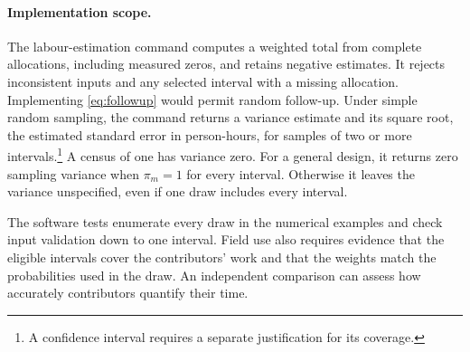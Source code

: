 \paragraph{Implementation scope.}
The labour-estimation command computes a weighted total from complete allocations, including measured zeros, and retains negative estimates. It rejects inconsistent inputs and any selected interval with a missing allocation. Implementing \eqref{eq:followup} would permit random follow-up. Under simple random sampling, the command returns a variance estimate and its square root, the estimated standard error in person-hours, for samples of two or more intervals.\footnote{A confidence interval requires a separate justification for its coverage.} A census of one has variance zero. For a general design, it returns zero sampling variance when $\pi_m=1$ for every interval. Otherwise it leaves the variance unspecified, even if one draw includes every interval.

The software tests enumerate every draw in the numerical examples and check input validation down to one interval. Field use also requires evidence that the eligible intervals cover the contributors' work and that the weights match the probabilities used in the draw. An independent comparison can assess how accurately contributors quantify their time.
